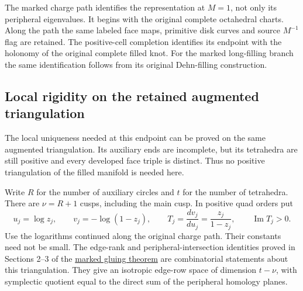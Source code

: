 The marked charge path identifies the representation at \(M=1\),
not only its peripheral eigenvalues. It begins with the original
complete octahedral charts. Along the path the same labeled face maps,
primitive disk curves and source \(M^{-1}\) flag are retained.
The positive-cell completion identifies its endpoint with the
holonomy of the original complete filled knot. For the marked
long-filling branch the same identification follows from its original
Dehn-filling construction.

\subsection{Local rigidity on the retained augmented
triangulation}\label{gi:positive-augmented-filled-germ}

The local uniqueness needed at this endpoint can be proved on the same
augmented triangulation. Its auxiliary ends are incomplete, but its
tetrahedra are still positive and every developed face triple is
distinct. Thus no positive triangulation of the filled manifold is
needed here.

Write \(R\) for the number of auxiliary circles and \(t\) for the
number of tetrahedra. There are \(\nu=R+1\) cusps, including the
main cusp. In positive quad orders put \begin{equation}\label{gi:A2b}
u_j=\log z_j,\qquad v_j=-\log(1-z_j),\qquad
 T_j=\frac{dv_j}{du_j}=\frac{z_j}{1-z_j},\qquad
 \operatorname{Im}T_j>0.
\end{equation} Use the logarithms continued along the original charge path. Their
constants need not be small. The edge-rank and peripheral-intersection
identities proved in Sections 2--3 of the
\href{https://sashakolpakov.github.io/murakamis_dream/notes/general_marked_multicusp_gluing_rigidity.html}{marked gluing
theorem} are combinatorial statements about this triangulation. They
give an isotropic edge-row space of dimension \(t-\nu\), with symplectic
quotient equal to the direct sum of the peripheral homology planes.

